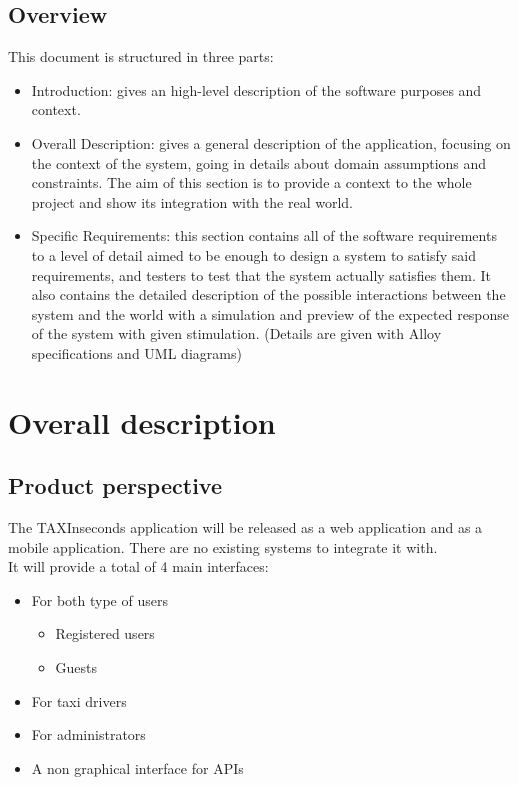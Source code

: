 \documentclass{article}
\begin{document}
\subsection{Overview}
This document is structured in three parts:
\begin{itemize}
	\item Introduction: gives an high-level description of the software purposes and context.
	\item Overall Description: gives a general description of the application, focusing on the context of the system, going in details about domain assumptions and constraints. The aim of this section is to provide a context to the whole project and show its integration with the real world.
	\item Specific Requirements: this section contains all of the software requirements to a level of detail aimed to be enough to design a system to satisfy said requirements, and testers to test that the system actually satisfies them. It also contains the detailed description of the possible interactions between the system and the world with a simulation and preview of the expected response of the system with given stimulation. (Details are given with Alloy specifications and UML diagrams)
\end{itemize}


\section{Overall description}
\subsection{Product perspective}
The TAXInseconds application will be released as a web application and as a mobile application. 
There are no existing systems to integrate it with. 
\\It will provide a total of 4 main interfaces:
\begin{itemize}
	\item For both type of users
		\begin{itemize}
			\item Registered users
			\item Guests
		\end{itemize}
	\item For taxi drivers 
	\item For administrators
	\item A non graphical interface for APIs 
\end{itemize}
\end{document}
